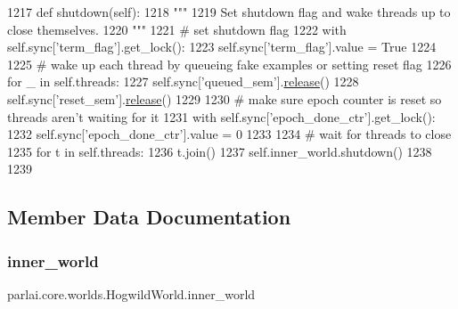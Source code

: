 \begin{DoxyCode}
1217     \textcolor{keyword}{def }shutdown(self):
1218         \textcolor{stringliteral}{"""}
1219 \textcolor{stringliteral}{        Set shutdown flag and wake threads up to close themselves.}
1220 \textcolor{stringliteral}{        """}
1221         \textcolor{comment}{# set shutdown flag}
1222         with self.sync[\textcolor{stringliteral}{'term\_flag'}].get\_lock():
1223             self.sync[\textcolor{stringliteral}{'term\_flag'}].value = \textcolor{keyword}{True}
1224 
1225         \textcolor{comment}{# wake up each thread by queueing fake examples or setting reset flag}
1226         \textcolor{keywordflow}{for} \_ \textcolor{keywordflow}{in} self.threads:
1227             self.sync[\textcolor{stringliteral}{'queued\_sem'}].\hyperlink{namespaceconf_a325dc746d8bf05c54d26351c35a21d90}{release}()
1228             self.sync[\textcolor{stringliteral}{'reset\_sem'}].\hyperlink{namespaceconf_a325dc746d8bf05c54d26351c35a21d90}{release}()
1229 
1230         \textcolor{comment}{# make sure epoch counter is reset so threads aren't waiting for it}
1231         with self.sync[\textcolor{stringliteral}{'epoch\_done\_ctr'}].get\_lock():
1232             self.sync[\textcolor{stringliteral}{'epoch\_done\_ctr'}].value = 0
1233 
1234         \textcolor{comment}{# wait for threads to close}
1235         \textcolor{keywordflow}{for} t \textcolor{keywordflow}{in} self.threads:
1236             t.join()
1237         self.inner\_world.shutdown()
1238 
1239 
\end{DoxyCode}


\subsection{Member Data Documentation}
\mbox{\label{classparlai_1_1core_1_1worlds_1_1HogwildWorld_a4138f2e9cd59f349ac7b737256faf383}} 
\subsubsection{\texorpdfstring{inner\+\_\+world}{inner\_world}}
{\footnotesize\ttfamily parlai.\+core.\+worlds.\+Hogwild\+World.\+inner\+\_\+world}



